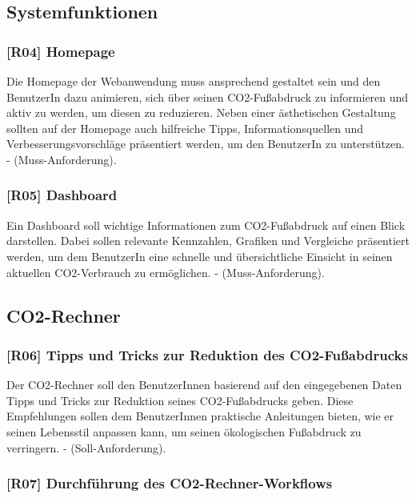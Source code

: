 \subsection{Systemfunktionen}

\subsubsection{[R04] Homepage}

Die Homepage der Webanwendung muss ansprechend gestaltet sein und den BenutzerIn dazu animieren, sich über seinen CO2-Fußabdruck zu informieren und aktiv zu werden, um diesen zu reduzieren. Neben einer ästhetischen Gestaltung sollten auf der Homepage auch hilfreiche Tipps, Informationsquellen und Verbesserungsvorschläge präsentiert werden, um den BenutzerIn zu unterstützen. - (Muss-Anforderung).

\subsubsection{[R05] Dashboard}

Ein Dashboard soll wichtige Informationen zum CO2-Fußabdruck auf einen Blick darstellen. Dabei sollen relevante Kennzahlen, Grafiken und Vergleiche präsentiert werden, um dem BenutzerIn eine schnelle und übersichtliche Einsicht in seinen aktuellen CO2-Verbrauch zu ermöglichen. - (Muss-Anforderung).

\subsection{CO2-Rechner}

\subsubsection{[R06] Tipps und Tricks zur Reduktion des CO2-Fußabdrucks}

Der CO2-Rechner soll den BenutzerInnen basierend auf den eingegebenen Daten Tipps und Tricks zur Reduktion seines CO2-Fußabdrucks geben.
Diese Empfehlungen sollen dem BenutzerInnen praktische Anleitungen bieten, wie er seinen Lebensstil anpassen kann, um seinen ökologischen Fußabdruck zu verringern. - (Soll-Anforderung).

\subsubsection{[R07] Durchführung des CO2-Rechner-Workflows}

